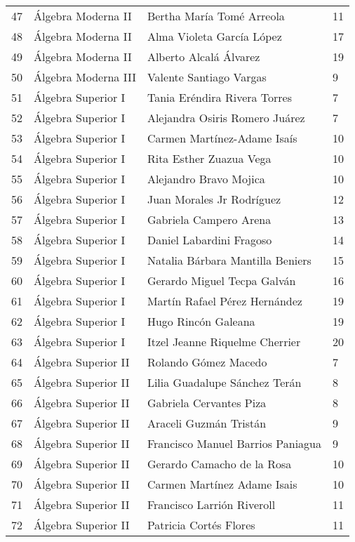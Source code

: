 \begin{table}[ht]
\begin{tabular}{rlll}
  47 & Álgebra Moderna II & Bertha María Tomé Arreola & 11 \\ 
  48 & Álgebra Moderna II & Alma Violeta García López & 17 \\ 
  49 & Álgebra Moderna II & Alberto Alcalá Álvarez & 19 \\ 
  50 & Álgebra Moderna III & Valente Santiago Vargas & 9 \\ 
  51 & Álgebra Superior I & Tania Eréndira Rivera Torres & 7 \\ 
  52 & Álgebra Superior I & Alejandra Osiris Romero Juárez & 7 \\ 
  53 & Álgebra Superior I & Carmen Martínez-Adame Isaís & 10 \\ 
  54 & Álgebra Superior I & Rita Esther Zuazua Vega & 10 \\ 
  55 & Álgebra Superior I & Alejandro Bravo Mojica & 10 \\ 
  56 & Álgebra Superior I & Juan Morales Jr Rodríguez & 12 \\ 
  57 & Álgebra Superior I & Gabriela Campero Arena & 13 \\ 
  58 & Álgebra Superior I & Daniel Labardini Fragoso & 14 \\ 
  59 & Álgebra Superior I & Natalia Bárbara Mantilla Beniers & 15 \\ 
  60 & Álgebra Superior I & Gerardo Miguel Tecpa Galván & 16 \\ 
  61 & Álgebra Superior I & Martín Rafael Pérez Hernández & 19 \\ 
  62 & Álgebra Superior I & Hugo Rincón Galeana & 19 \\ 
  63 & Álgebra Superior I & Itzel Jeanne Riquelme Cherrier & 20 \\ 
  64 & Álgebra Superior II & Rolando Gómez Macedo & 7 \\ 
  65 & Álgebra Superior II & Lilia Guadalupe Sánchez Terán & 8 \\ 
  66 & Álgebra Superior II & Gabriela Cervantes Piza & 8 \\ 
  67 & Álgebra Superior II & Araceli Guzmán Tristán & 9 \\ 
  68 & Álgebra Superior II & Francisco Manuel Barrios Paniagua & 9 \\ 
  69 & Álgebra Superior II & Gerardo Camacho de la Rosa & 10 \\ 
  70 & Álgebra Superior II & Carmen Martínez Adame Isais & 10 \\ 
  71 & Álgebra Superior II & Francisco Larrión Riveroll & 11 \\ 
  72 & Álgebra Superior II & Patricia Cortés Flores & 11 \\ 

\end{tabular}
\end{table}
